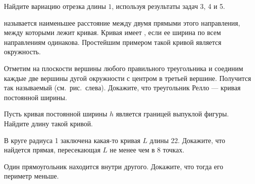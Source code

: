 \documentclass[10pt]{article}
\begin{document}
Найдите %
вариацию отрезка длины $1$,
используя результаты задач 3, 4 и 5.


 называется наименьшее
расстояние между двумя прямыми этого направления, между которыми
лежит кривая.
Кривая имеет , если ее ширина по всем направлениям
одинакова.
Простейшим примером такой кривой %
является окружность.


Отметим на плоскости вершины любого правильного треугольника
и соединим каждые две вершины дугой окружности с центром в третьей
вершине. Получится так называемый 
(см.~рис.~слева). Докажите, что треугольник Релло
--- кривая постоянной ширины.



Пусть кривая постоянной ширины $h$ является границей выпуклой фигуры.
Найдите длину такой кривой.


В круге радиуса 1 заключена какая-то кривая $L$ длины 22. Докажите, что
найдется прямая, пересекающая $L$ не менее чем в 8 точках.



Один прямоугольник находится внутри другого. Докажите, что тогда его периметр меньше.

\end{document}
